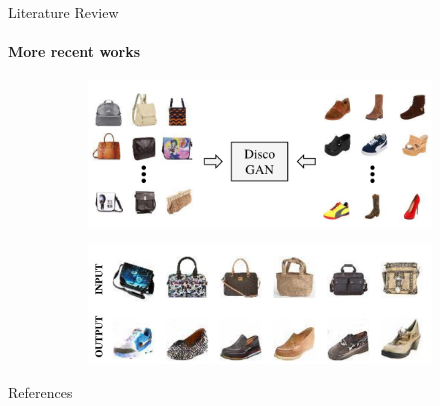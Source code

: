\documentclass{beamer}
\begin{document}
\begin{frame}{Literature Review}
    \framesubtitle{More recent works}
    \begin{figure}[H]
        \centering
        \begin{subfigure}[b]{.8\textwidth}
            \includegraphics[width=\textwidth]{img/discoGanI.png}
        \end{subfigure}
        \begin{subfigure}[b]{.8\textwidth}
            \includegraphics[width=\textwidth]{img/discoGanII.png}
        \end{subfigure}
        \caption*{}
    \end{figure}
\end{frame}

\begin{frame}[allowframebreaks]{References}
    
    
\end{frame}
\end{document}
